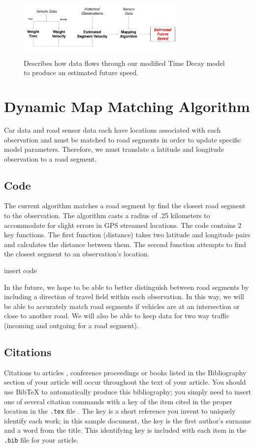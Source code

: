 \documentclass{vldb}
\begin{document}
\begin{figure}
\centering
\includegraphics[width=3.25in,height=1.25in]{TimeDecay}
\caption{Describes how data flows through our modified Time Decay model to produce an estimated future speed.}
\label{fig:networkdiagram}
\end{figure}

\section {Dynamic Map Matching Algorithm}
Car data and road sensor data each have locations associated with each observation and must be matched to road segments in order to update specific model parameters. Therefore, we must translate a latitude and longitude observation to a road segment. 

\subsection{Code}
The current algorithm matches a road segment by find the closest road segment to the observation. The algorithm casts a radius of .25 kilometers to accommodate for slight errors in GPS streamed locations. The code contains 2 key functions. The first function (distance) takes two latitude and longitude pairs and calculates the distance between them. The second function attempts to find the closest segment to an observation’s location.

insert code

In the future, we hope to be able to better distinguish between road segments by including a direction of travel field within each observation. In this way, we will be able to accurately match road segments if vehicles are at an intersection or close to another road. We will also be able to keep data for two way traffic (incoming and outgoing for a road segment). 

\subsection{Citations}
Citations to articles \cite{bowman:reasoning, clark:pct, braams:babel, herlihy:methodology},
conference
proceedings \cite{clark:pct} or books \cite{salas:calculus, Lamport:LaTeX} listed
in the Bibliography section of your
article will occur throughout the text of your article.
You should use BibTeX to automatically produce this bibliography;
you simply need to insert one of several citation commands with
a key of the item cited in the proper location in
the \texttt{.tex} file \cite{Lamport:LaTeX}.
The key is a short reference you invent to uniquely
identify each work; in this sample document, the key is
the first author's surname and a
word from the title.  This identifying key is included
with each item in the \texttt{.bib} file for your article.
\end{document}
